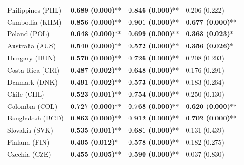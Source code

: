 \begin{longtable}{p{5cm}p{3cm}p{3cm}p{5cm}}
Philippines (PHL) & \textcolor{atlLime600}{\textbf{0.689 (0.000)}**} & \textcolor{atlLime600}{\textbf{0.846 (0.000)}**} & \textcolor{atlOrange600}{0.206 (0.222)} \\
Cambodia (KHM) & \textcolor{atlLime600}{\textbf{0.856 (0.000)}**} & \textcolor{atlLime600}{\textbf{0.901 (0.000)}**} & \textcolor{atlLime600}{\textbf{0.677 (0.000)}**} \\
Poland (POL) & \textcolor{atlLime600}{\textbf{0.648 (0.000)}**} & \textcolor{atlLime600}{\textbf{0.699 (0.000)}**} & \textcolor{atlLime600}{\textbf{0.363 (0.023)}*} \\
Australia (AUS) & \textcolor{atlLime600}{\textbf{0.540 (0.000)}**} & \textcolor{atlLime600}{\textbf{0.572 (0.000)}**} & \textcolor{atlLime600}{\textbf{0.356 (0.026)}*} \\
Hungary (HUN) & \textcolor{atlLime600}{\textbf{0.570 (0.000)}**} & \textcolor{atlLime600}{\textbf{0.726 (0.000)}**} & \textcolor{atlOrange600}{0.208 (0.203)} \\
Costa Rica (CRI) & \textcolor{atlLime600}{\textbf{0.487 (0.002)}**} & \textcolor{atlLime600}{\textbf{0.648 (0.000)}**} & \textcolor{atlOrange600}{0.176 (0.291)} \\
Denmark (DNK) & \textcolor{atlLime600}{\textbf{0.491 (0.002)}**} & \textcolor{atlLime600}{\textbf{0.573 (0.000)}**} & \textcolor{atlOrange600}{0.183 (0.264)} \\
Chile (CHL) & \textcolor{atlLime600}{\textbf{0.523 (0.001)}**} & \textcolor{atlLime600}{\textbf{0.754 (0.000)}**} & \textcolor{atlOrange600}{0.250 (0.130)} \\
Colombia (COL) & \textcolor{atlLime600}{\textbf{0.727 (0.000)}**} & \textcolor{atlLime600}{\textbf{0.768 (0.000)}**} & \textcolor{atlLime600}{\textbf{0.620 (0.000)}**} \\
Bangladesh (BGD) & \textcolor{atlLime600}{\textbf{0.863 (0.000)}**} & \textcolor{atlLime600}{\textbf{0.912 (0.000)}**} & \textcolor{atlLime600}{\textbf{0.702 (0.000)}**} \\
Slovakia (SVK) & \textcolor{atlLime600}{\textbf{0.535 (0.001)}**} & \textcolor{atlLime600}{\textbf{0.681 (0.000)}**} & \textcolor{atlOrange600}{0.131 (0.439)} \\
Finland (FIN) & \textcolor{atlLime600}{\textbf{0.405 (0.012)}*} & \textcolor{atlLime600}{\textbf{0.578 (0.000)}**} & \textcolor{atlOrange600}{0.182 (0.275)} \\
Czechia (CZE) & \textcolor{atlLime600}{\textbf{0.455 (0.005)}**} & \textcolor{atlLime600}{\textbf{0.590 (0.000)}**} & \textcolor{atlOrange600}{0.037 (0.830)} \\

\end{longtable}

